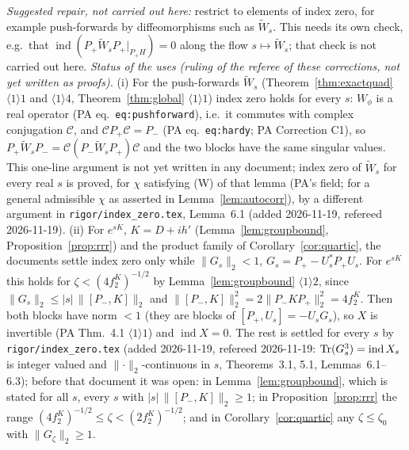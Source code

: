 \documentclass[11pt]{article}
\newcommand{\Wt}{\widetilde W}
\newcommand{\Pp}{P_+}\newcommand{\Pm}{P_-}
\newcommand{\norm}[1]{\lVert#1\rVert}
\begin{document}
\begin{enumerate}[label=(C\arabic*),ref=C\arabic*,leftmargin=3em]
 \emph{Suggested repair, not carried out here:} restrict to elements of index zero, for example
 push-forwards by diffeomorphisms such as $\Wt_s$.  This needs its own check, e.g.\ that
 $\operatorname{ind}(\Pp\Wt_s\Pp|_{\Pp H})=0$ along the flow $s\mapsto\Wt_s$; that check is not
 carried out here.
 \emph{Status of the uses (ruling of the referee of these corrections, not yet written as proofs).}
 (i) For the push-forwards $\Wt_s$ (Theorem~\ref{thm:exactquad} $\langle1\rangle1$ and
 $\langle1\rangle4$, Theorem~\ref{thm:global} $\langle1\rangle1$) index zero holds for every $s$:
 $W_\phi$ is a real operator (PA eq.~\texttt{eq:pushforward}), i.e.\ it commutes with complex
 conjugation $\mathcal C$, and $\mathcal C\Pp\mathcal C=\Pm$ (PA eq.~\texttt{eq:hardy}; PA
 Correction C1), so $\Pp\Wt_s\Pm=\mathcal C(\Pm\Wt_s\Pp)\mathcal C$ and the two blocks have the same
 singular values.  This one-line argument is not yet written in any document; index zero of $\Wt_s$ for every real $s$ is proved, for $\chi$ satisfying (W) of that lemma (PA's field; for a general admissible $\chi$ as asserted in Lemma~\ref{lem:autocorr}), by a different argument in \texttt{rigor/index\_zero.tex}, Lemma~6.1 (added 2026-11-19, refereed 2026-11-19).
 (ii) For $e^{sK}$, $K=D+ih'$ (Lemma~\ref{lem:groupbound}, Proposition~\ref{prop:rrr}) and the
 product family of Corollary~\ref{cor:quartic}, the documents settle index zero only while
 $\norm{G_s}_2<1$, $G_s=\Pp-U_s^*\Pp U_s$.  For $e^{sK}$ this holds for $\zeta<(4f_2^K)^{-1/2}$ by
 Lemma~\ref{lem:groupbound} $\langle1\rangle2$, since $\norm{G_s}_2\le|s|\,\norm{[\Pm,K]}_2$ and
 $\norm{[\Pm,K]}_2^2=2\norm{\Pm K\Pp}_2^2=4f_2^K$.  Then both blocks have norm $<1$ (they are
 blocks of $[\Pp,U_s]=-U_sG_s$), so $X$ is invertible (PA Thm.~4.1 $\langle1\rangle1$) and
 $\operatorname{ind}X=0$.  The rest is settled for every $s$ by \texttt{rigor/index\_zero.tex} (added 2026-11-19, refereed 2026-11-19:
 $\operatorname{Tr}(G_s^3)=\operatorname{ind}X_s$ is integer valued and $\norm\cdot_2$-continuous in $s$, Theorems~3.1, 5.1,
 Lemmas~6.1--6.3); before that document it was open: in Lemma~\ref{lem:groupbound}, which is stated for all $s$, every
 $s$ with $|s|\,\norm{[\Pm,K]}_2\ge1$; in Proposition~\ref{prop:rrr} the range
 $(4f_2^K)^{-1/2}\le\zeta<(2f_2^K)^{-1/2}$; and in Corollary~\ref{cor:quartic} any
 $\zeta\le\zeta_0$ with $\norm{G_\zeta}_2\ge1$.
\end{enumerate}
\end{document}
